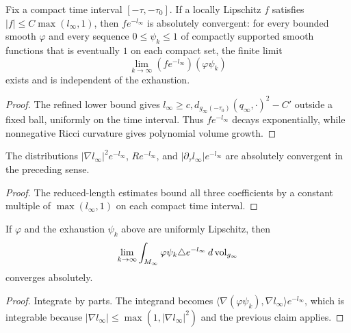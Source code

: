 \begin{claim}\label{claim:absolute-convergence-weighted-distribution}
\label{absconv1}

Fix a compact time interval $[-\tau,-\tau_0]$. If a locally
Lipschitz $f$ satisfies $|f|\leq C\max(l_\infty,1)$, then
$fe^{-l_\infty}$ is absolutely convergent: for every bounded smooth
$\varphi$ and every sequence $0\leq\psi_k\leq1$ of compactly
supported smooth functions that is eventually $1$ on each compact
set, the finite limit
\[
 \lim_{k\to\infty}(fe^{-l_\infty})(\varphi\psi_k)
\]
exists and is independent of the exhaustion.
\end{claim}
\begin{proof}
\sketch The refined lower bound gives
$l_\infty\geq c,d_{g_\infty(-\tau_0)}(q_\infty,\cdot)^2-C'$ outside
a fixed ball, uniformly on the time interval. Thus
$fe^{-l_\infty}$ decays exponentially, while nonnegative Ricci
curvature gives polynomial volume growth.
\end{proof}

\begin{corollary}\label{cor:absolute-convergence-gradient-terms}
\label{absconv}

The distributions $|\nabla l_\infty|^2e^{-l_\infty}$,
$Re^{-l_\infty}$, and
$|\partial_\tau l_\infty|e^{-l_\infty}$ are absolutely convergent
in the preceding sense.
\end{corollary}
\begin{proof}
\sketch
{}
The reduced-length estimates bound all three coefficients by a
constant multiple of $\max(l_\infty,1)$ on each compact time
interval.
\end{proof}

\begin{claim}\label{claim:absolute-convergence-laplacian-term}
\label{absconv2}

If $\varphi$ and the exhaustion $\psi_k$ above are uniformly
Lipschitz, then
\[
 \lim_{k\to\infty}\int_{M_\infty}
 \varphi\psi_k\triangle e^{-l_\infty}
 \,d\operatorname{vol}_{g_\infty}
\]
converges absolutely.
\end{claim}
\begin{proof}
\sketch Integrate by parts. The integrand becomes
$\langle\nabla(\varphi\psi_k),\nabla l_\infty\rangle e^{-l_\infty}$,
which is integrable because
$|\nabla l_\infty|\leq\max(1,|\nabla l_\infty|^2)$ and the previous
claim applies.
\end{proof}

